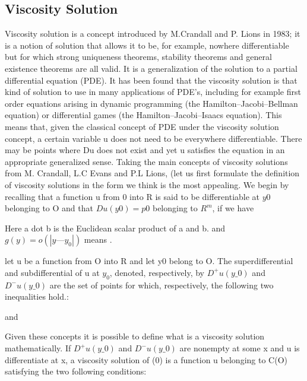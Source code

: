 \subsection{Viscosity Solution}
Viscosity solution is a concept introduced by M.Crandall and P. Lions in 1983; it is a notion of solution that allows it to be, for example, nowhere differentiable but for which strong uniqueness theorems, stability theorems and general existence theorems are all valid. It is a generalization of the solution to a partial differential equation (PDE). It has been found that the viscosity solution is that kind of solution to use in many applications of PDE's, including for example first order equations arising in dynamic programming (the Hamilton–Jacobi–Bellman equation) or differential games (the Hamilton–Jacobi–Isaacs equation). This means that, given the classical concept of PDE 
under the viscosity solution concept, a certain variable u does not need to be everywhere differentiable. There may be points where Du does not exist and yet u satisfies the equation in an appropriate generalized sense.
Taking the main concepts of viscosity solutions from M. Crandall, L.C Evans and P.L Lions, (let us first formulate the definition of viscosity solutions in the form we think is the most appealing. We begin by recalling that a function u from 0 into R is said to be differentiable at $y0$ belonging to O  and that $Du(y0) = p0$ belonging to $R^m$, if we have 



Here a dot b is the Euclidean scalar product of a and b. and $g(y) = o(|y — y_0 |)$ means
. 

let u be a function from O into R and let y0 belong to O.  The superdifferential and subdifferential of u at $y_0$, denoted, respectively, by $D^+u(y\_0)$ and $D^-u(y\_0)$ are the set of points for which, respectively, the following two inequalities hold.:

and

Given these concepts it is possible to define what is a viscosity solution mathematically. 
If $D^+u(y\_0)$ and $D^-u(y\_0)$ are nonempty at some x and u is differentiate at x, a viscosity solution of (0) is a function u belonging to C(O) satisfying the two following conditions:


